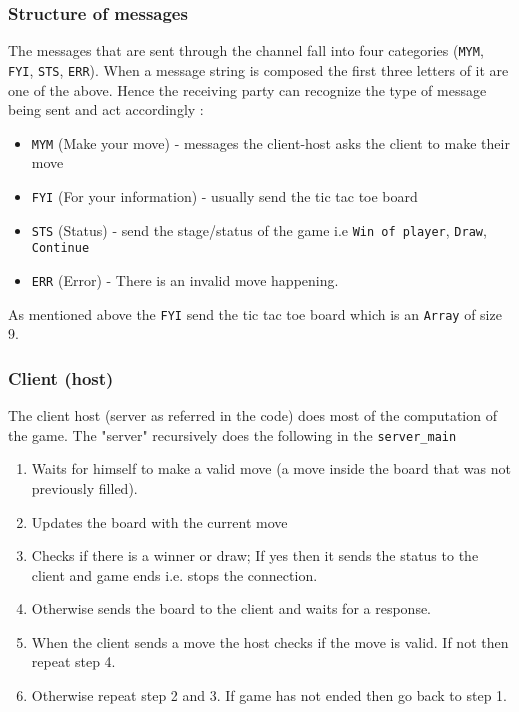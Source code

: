 \documentclass[10pt,a4paper]{article}
\begin{document}
\subsubsection{Structure of messages}
The messages that are sent through the channel fall into four categories (\texttt{MYM}, \texttt{FYI}, \texttt{STS}, \texttt{ERR}). When a message string is composed the first three letters of it are one of the above. Hence the receiving party can recognize the type of message being sent and act accordingly :
\begin{itemize}
\item \texttt{MYM} (Make your move) - messages the client-host asks the client to make their move
\item \texttt{FYI} (For your information) - usually send the tic tac toe board
\item \texttt{STS} (Status) - send the stage/status of the game i.e \texttt{Win of player}, \texttt{Draw}, \texttt{Continue}
\item \texttt{ERR} (Error) - There is an invalid move happening.
\end{itemize} 
As mentioned above the \texttt{FYI} send the tic tac toe board which is an \texttt{Array} of size 9. 
\subsubsection{Client (host)}
The client host (server as referred in the code) does most of the computation of the game.  The "server" recursively does the following in the \texttt{server\_main}
\begin{enumerate}
\item Waits for himself to make a valid move (a move inside the board that was not previously filled).
\item Updates the board with the current move
\item Checks if there is a winner or draw; If yes then it sends the status to the client and game ends i.e. stops the connection.
\item Otherwise sends the board to the client and waits for a response.
\item When the client sends a move the host checks if the move is valid. If not then repeat step 4. 
\item Otherwise repeat step 2 and 3. If game has not ended then go back to step 1.
\end{enumerate}
\end{document}
